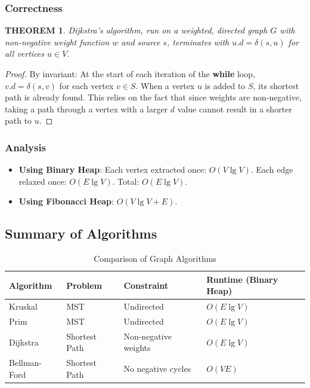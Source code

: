 \documentclass[12pt]{article}
\theoremstyle{blueplain}
\newtheorem{theorem}{THEOREM}[section]
\theoremstyle{bluedef}
\theoremstyle{blueremark}
\begin{document}
\subsubsection{Correctness}
\begin{theorem}
    Dijkstra's algorithm, run on a weighted, directed graph $G$ with non-negative weight function $w$ and source $s$, terminates with $u.d = \delta(s, u)$ for all vertices $u \in V$.
\end{theorem}
\begin{proof}
    By invariant: At the start of each iteration of the \textbf{while} loop, $v.d = \delta(s, v)$ for each vertex $v \in S$.
    When a vertex $u$ is added to $S$, its shortest path is already found. This relies on the fact that since weights are non-negative, taking a path through a vertex with a larger $d$ value cannot result in a shorter path to $u$.
\end{proof}

\subsubsection{Analysis}
\begin{itemize}
    \item \textbf{Using Binary Heap}: Each vertex extracted once: $O(V \lg V)$. Each edge relaxed once: $O(E \lg V)$. Total: $O(E \lg V)$.
    \item \textbf{Using Fibonacci Heap}: $O(V \lg V + E)$.
\end{itemize}

\subsection{Summary of Algorithms}

\begin{table}[h]
    \centering
    \begin{tabular}{|l|l|l|l|}
        \hline
        \textbf{Algorithm} & \textbf{Problem} & \textbf{Constraint}  & \textbf{Runtime (Binary Heap)} \\ \hline
        Kruskal            & MST              & Undirected           & $O(E \lg V)$                   \\ \hline
        Prim               & MST              & Undirected           & $O(E \lg V)$                   \\ \hline
        Dijkstra           & Shortest Path    & Non-negative weights & $O(E \lg V)$                   \\ \hline
        Bellman-Ford       & Shortest Path    & No negative cycles   & $O(VE)$                        \\ \hline
    \end{tabular}
    \caption{Comparison of Graph Algorithms}
\end{table}

\clearpage

\printindex
\end{document}
